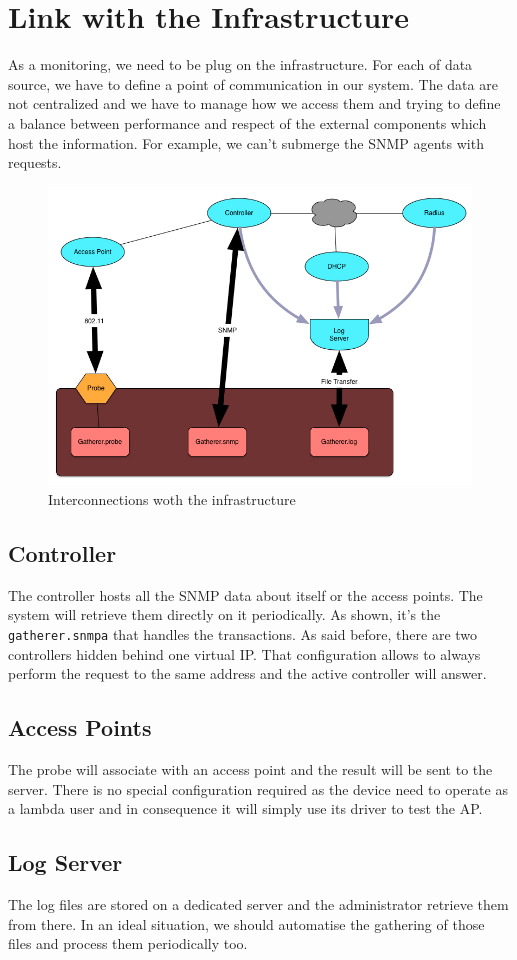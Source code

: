 \section{Link with the Infrastructure}
As a monitoring, we need to be plug on the infrastructure. For each of data source, we have to define a point of communication in our system. The data are not centralized and we have to manage how we access them and trying to define a balance between performance and respect of the external components which host the information. For example, we can't submerge the SNMP agents with requests.

\begin{figure}[H]
\centering
	\includegraphics[width=1\linewidth]{Pictures/chapter3/interactions.jpg}
	\caption{Interconnections woth the infrastructure}
\end{figure}

\subsection{Controller}
The controller hosts all the SNMP data about itself or the access points. The system will retrieve them directly on it periodically. As shown, it's the \texttt{gatherer.snmpa} that handles the transactions. As said before, there are two controllers hidden behind one virtual IP. That configuration allows to always perform the request to the same address and the active controller will answer.
\subsection{Access Points}
The probe will associate with an access point and the result will be sent to the server. There is no special configuration required as the device need to operate as a lambda user and in consequence it will simply use its driver to test the AP. 
\subsection{Log Server} 
The log files are stored on a dedicated server and the administrator retrieve them from there. In an ideal situation, we should automatise the gathering of those files and process them periodically too.
